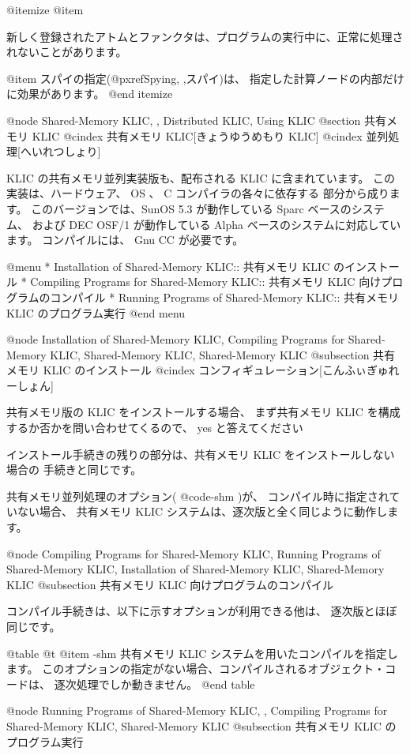 {{{{@itemize
@item

新しく登録されたアトムとファンクタは、プログラムの実行中に、正常に処理されないことがあります。

@item
スパイの指定(@pxref{Spying, ,スパイ})は、
指定した計算ノードの内部だけに効果があります。
@end itemize

@node Shared-Memory KLIC,  , Distributed KLIC, Using KLIC
@section 共有メモリ KLIC
@cindex 共有メモリ KLIC[きょうゆうめもり KLIC]
@cindex 並列処理[へいれつしょり]

KLIC の共有メモリ並列実装版も、配布される KLIC に含まれています。
この実装は、ハードウェア、 OS 、 C コンパイラの各々に依存する
部分から成ります。
このバージョンでは、SunOS 5.3 が動作している Sparc ベースのシステム、
および DEC OSF/1 が動作している Alpha ベースのシステムに対応しています。
コンパイルには、 Gnu CC が必要です。

@menu
* Installation of Shared-Memory KLIC::          共有メモリ KLIC のインストール
* Compiling Programs for Shared-Memory KLIC::   共有メモリ KLIC 向けプログラムのコンパイル
* Running Programs of Shared-Memory KLIC::      共有メモリ KLIC のプログラム実行
@end menu

@node Installation of Shared-Memory KLIC, Compiling Programs for Shared-Memory KLIC, Shared-Memory KLIC, Shared-Memory KLIC
@subsection 共有メモリ KLIC のインストール
@cindex コンフィギュレーション[こんふぃぎゅれーしょん]

共有メモリ版の KLIC をインストールする場合、
まず共有メモリ KLIC を構成するか否かを問い合わせてくるので、
 yes と答えてください

インストール手続きの残りの部分は、共有メモリ KLIC をインストールしない場合の
手続きと同じです。

共有メモリ並列処理のオプション( @code{-shm} )が、
コンパイル時に指定されていない場合、
共有メモリ KLIC システムは、逐次版と全く同じように動作します。

@node Compiling Programs for Shared-Memory KLIC, Running Programs of Shared-Memory KLIC, Installation of Shared-Memory KLIC, Shared-Memory KLIC
@subsection 共有メモリ KLIC 向けプログラムのコンパイル

コンパイル手続きは、以下に示すオプションが利用できる他は、
逐次版とほぼ同じです。

@table @t
@item -shm
共有メモリ KLIC システムを用いたコンパイルを指定します。
このオプションの指定がない場合、コンパイルされるオブジェクト・コードは、
逐次処理でしか動きません。
@end table

@node Running Programs of Shared-Memory KLIC,  , Compiling Programs for Shared-Memory KLIC, Shared-Memory KLIC
@subsection 共有メモリ KLIC のプログラム実行

}}}}
